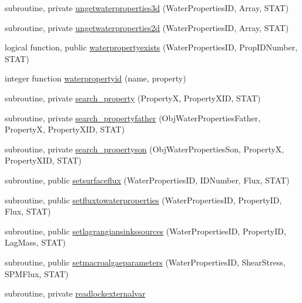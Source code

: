 \begin{DoxyCompactItemize}
\item 
subroutine, private \mbox{\hyperlink{namespacemodulewaterproperties_ab4f28352125d7c0b068c093e4ffb88dd}{ungetwaterproperties3d}} (Water\+Properties\+ID, Array, S\+T\+AT)
\item 
subroutine, private \mbox{\hyperlink{namespacemodulewaterproperties_ab8a50929e1e5fe0ebe591654fa4fd52f}{ungetwaterproperties2d}} (Water\+Properties\+ID, Array, S\+T\+AT)
\item 
logical function, public \mbox{\hyperlink{namespacemodulewaterproperties_a2c7278a1e0767b9b9c5419a5b34299f5}{waterpropertyexists}} (Water\+Properties\+ID, Prop\+I\+D\+Number, S\+T\+AT)
\item 
integer function \mbox{\hyperlink{namespacemodulewaterproperties_a628b8ae42fe46f1e958582529ab79db4}{waterpropertyid}} (name, property)
\item 
subroutine, private \mbox{\hyperlink{namespacemodulewaterproperties_ae6b7d758da27fb15faee52b3ed14029d}{search\+\_\+property}} (PropertyX, Property\+X\+ID, S\+T\+AT)
\item 
subroutine, private \mbox{\hyperlink{namespacemodulewaterproperties_a1dec5db35cff13d783df415f7991aff7}{search\+\_\+propertyfather}} (Obj\+Water\+Properties\+Father, PropertyX, Property\+X\+ID, S\+T\+AT)
\item 
subroutine, private \mbox{\hyperlink{namespacemodulewaterproperties_afdb62b42fe2bd1edafce470c06060ee4}{search\+\_\+propertyson}} (Obj\+Water\+Properties\+Son, PropertyX, Property\+X\+ID, S\+T\+AT)
\item 
subroutine, public \mbox{\hyperlink{namespacemodulewaterproperties_a2550f7996bf177225c3f5a9830c86707}{setsurfaceflux}} (Water\+Properties\+ID, I\+D\+Number, Flux, S\+T\+AT)
\item 
subroutine, public \mbox{\hyperlink{namespacemodulewaterproperties_a5d755fdb3bd199311d38f1f88cbd7f10}{setfluxtowaterproperties}} (Water\+Properties\+ID, Property\+ID, Flux, S\+T\+AT)
\item 
subroutine, public \mbox{\hyperlink{namespacemodulewaterproperties_a829c556b5c2c23f02481f958f56e77b2}{setlagrangiansinkssources}} (Water\+Properties\+ID, Property\+ID, Lag\+Mass, S\+T\+AT)
\item 
subroutine, public \mbox{\hyperlink{namespacemodulewaterproperties_a04f02aae382274eb3a7fb04e8be06e48}{setmacroalgaeparameters}} (Water\+Properties\+ID, Shear\+Stress, S\+P\+M\+Flux, S\+T\+AT)
\item 
subroutine, private \mbox{\hyperlink{namespacemodulewaterproperties_a463922f7665f0f3507bff58df80af6f7}{readlockexternalvar}}

\end{DoxyCompactItemize}
